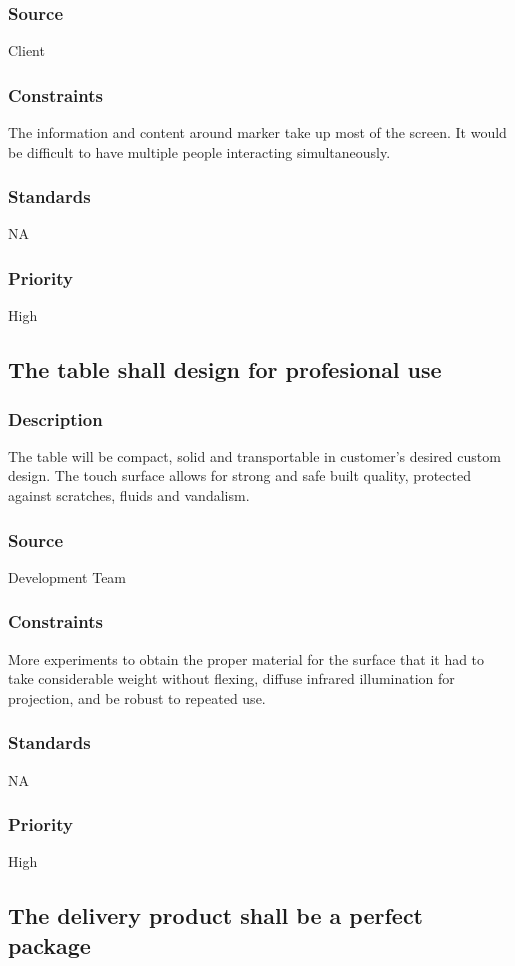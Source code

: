 \subsubsection{Source}
Client
\subsubsection{Constraints}
The information and content around marker take up most of the screen. It would be difficult to have multiple people interacting simultaneously.
\subsubsection{Standards}
NA
\subsubsection{Priority}
High

\subsection{The table shall design for profesional use}
\subsubsection{Description}
The table will be compact, solid and transportable in customer's desired custom design. The touch surface allows for strong and safe built quality, protected against scratches, fluids and vandalism.
\subsubsection{Source}
Development Team
\subsubsection{Constraints}
More experiments to obtain the proper material for the surface that it had to take considerable weight without flexing, diffuse infrared illumination for projection, and be robust to repeated use.
\subsubsection{Standards}
NA
\subsubsection{Priority}
High

\subsection{The delivery product shall be a perfect package}
